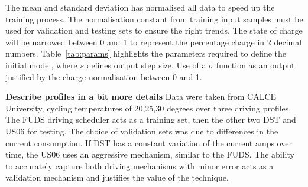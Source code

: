 %
%
The mean and standard deviation has normalised all data to speed up the training process.
The normalisation constant from training input samples must be used for validation and testing sets to ensure the right trends.
The state of charge will be narrowed between 0 and 1 to represent the percentage charge in 2 decimal numbers.
\mbox{Table~\ref{tab:params}} highlights the parameters required to define the initial model, where $s$ defines output step size.
Use of a $\sigma$ function as an output justified by the charge normalisation between 0 and 1.
\begin{table}[ht]
    \renewcommand{\arraystretch}{1.3}
    \caption{Model structure and parameters}
    \centering
    \label{tab:params}
\end{table}

%
%
\textbf{Describe profiles in a bit more details}
Data were taken from CALCE University, cycling temperatures of 20,25,30 degrees over three driving profiles.
The FUDS driving scheduler acts as a training set, then the other two DST and US06 for testing.
The choice of validation sets was due to differences in the current consumption.
If DST has a constant variation of the current amps over time, the US06 uses an aggressive mechanism, similar to the FUDS.
The ability to accurately capture both driving mechanisms with minor error acts as a validation mechanism and justifies the value of the technique.

